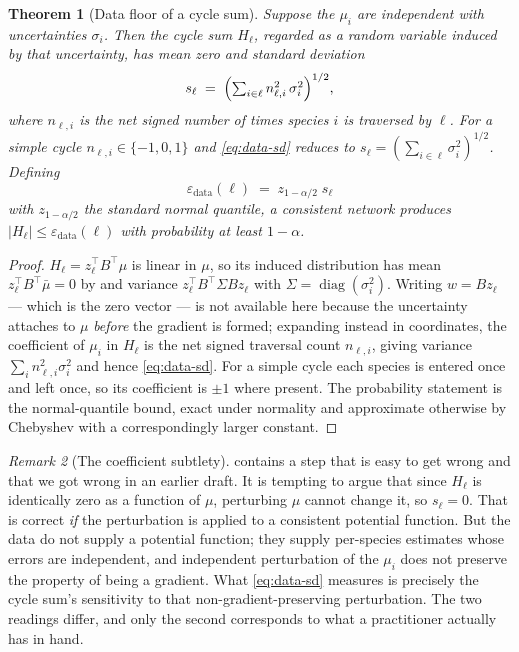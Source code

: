 \documentclass[11pt,twocolumn,a4paper]{article}
\theoremstyle{pstyle}
\newtheorem{theorem}{Theorem}[section]
\theoremstyle{definition}
\theoremstyle{remark}
\newtheorem{remark}[theorem]{Remark}
\newcommand{\abs}[1]{\lvert#1\rvert}
\newcommand{\eps}{\varepsilon}
\newcommand{\epsdata}{\eps_{\mathrm{data}}}
\newcommand{\hol}{H}
\begin{document}
\begin{theorem}[Data floor of a cycle sum]
\label{thm:data-floor}
Suppose the $\mu_i$ are independent with uncertainties $\sigma_i$. Then
the cycle sum $\hol_\ell$, regarded as a random variable induced by that
uncertainty, has mean zero and standard deviation
\begin{equation}
  s_\ell \;=\; \Bigl(\textstyle\sum_{i\in\ell} n_{\ell,i}^{2}\,
  \sigma_i^{2}\Bigr)^{1/2},
  \label{eq:data-sd}
\end{equation}
where $n_{\ell,i}$ is the net signed number of times species $i$ is
traversed by $\ell$. For a simple cycle $n_{\ell,i}\in\{-1,0,1\}$ and
\eqref{eq:data-sd} reduces to
$s_\ell = (\sum_{i\in\ell}\sigma_i^{2})^{1/2}$. Defining
\begin{equation}
  \epsdata(\ell) \;=\; z_{1-\alpha/2}\; s_\ell
  \label{eq:data-floor}
\end{equation}
with $z_{1-\alpha/2}$ the standard normal quantile, a consistent network
produces $\abs{\hol_\ell} \le \epsdata(\ell)$ with probability at least
$1-\alpha$.
\end{theorem}

\begin{proof}
$\hol_\ell = z_\ell^{\top}B^{\top}\mu$ is linear in $\mu$, so its
induced distribution has mean $z_\ell^{\top}B^{\top}\bar\mu = 0$ by
 and variance
$z_\ell^{\top}B^{\top}\Sigma B z_\ell$ with $\Sigma=
\operatorname{diag}(\sigma_i^{2})$. Writing $w = Bz_\ell$ --- which is
the zero vector --- is not available here because the uncertainty
attaches to $\mu$ \emph{before} the gradient is formed; expanding
instead in coordinates, the coefficient of $\mu_i$ in $\hol_\ell$ is the
net signed traversal count $n_{\ell,i}$, giving variance
$\sum_i n_{\ell,i}^{2}\sigma_i^{2}$ and hence \eqref{eq:data-sd}. For a
simple cycle each species is entered once and left once, so its
coefficient is $\pm1$ where present. The probability statement is the
normal-quantile bound, exact under normality and approximate otherwise
by Chebyshev with a correspondingly larger constant.
\end{proof}

\begin{remark}[The coefficient subtlety]
\label{rem:coefficient}
 contains a step that is easy to get wrong and that
we got wrong in an earlier draft. It is tempting to argue that since
$\hol_\ell$ is identically zero as a function of $\mu$, perturbing $\mu$
cannot change it, so $s_\ell=0$. That is correct \emph{if} the
perturbation is applied to a consistent potential function. But the data
do not supply a potential function; they supply per-species estimates
whose errors are independent, and independent perturbation of the
$\mu_i$ does not preserve the property of being a gradient. What
\eqref{eq:data-sd} measures is precisely the cycle sum's sensitivity to
that non-gradient-preserving perturbation. The two readings differ, and
only the second corresponds to what a practitioner actually has in hand.
\end{remark}
\end{document}
